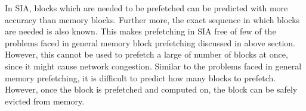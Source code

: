 In SIA, blocks which are needed to be prefetched can be predicted with more accuracy
than memory blocks. Further more, the exact sequence in which blocks are needed is also known.
This makes prefetching in SIA free of few of the problems faced in general memory
block prefetching discussed in above section. However, this cannot be used to
prefetch a large of number of blocks at once, since it might cause network congestion.
Similar to the problems faced in general
memory prefetching, it is difficult to predict how many blocks to prefetch. However,
once the block is prefetched and computed on, the block can be safely evicted from
memory.
